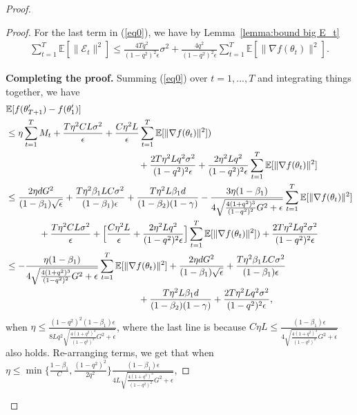 \documentclass[11pt]{article}
\begin{document}
\begin{proof}
\begin{proof}
For the last term in (\ref{eq0}), we have by Lemma~\ref{lemma:bound big E_t}
\begin{align*}
    \sum_{t=1}^T \mathbb E[\|\mathcal E_t\|^2]\leq \frac{4Tq^2}{(1-q^2)^2\epsilon}\sigma^2 + \frac{4q^2}{(1-q^2)^2\epsilon} \sum_{t=1}^T \mathbb E[\|\nabla f(\theta_t)\|^2].
\end{align*}

\textbf{Completing the proof.} Summing (\ref{eq0}) over $t=1,...,T$ and integrating things together, we have
\begin{align*}
    &\mathbb E[f(\theta_{T+1}')-f(\theta_1')]\\
    &\leq \eta \sum_{t=1}^T M_t+\frac{T\eta^2 CL\sigma^2}{\epsilon}+\frac{C\eta^2 L}{\epsilon} \sum_{t=1}^T \mathbb E[\|\nabla f(\theta_t)\|^2])\\
    &\hspace{2in} +\frac{2T\eta^2L q^2\sigma^2}{(1-q^2)^2\epsilon}+ \frac{2\eta^2 L q^2}{(1-q^2)^2\epsilon} \sum_{t=1}^T \mathbb E[\|\nabla f(\theta_t)\|^2]\\
    &\leq \frac{2\eta dG^2}{(1-\beta_1)\sqrt\epsilon}+\frac{T\eta^2 \beta_1 LC\sigma^2}{(1-\beta_1)\epsilon}+\frac{T\eta^2 L\beta_1 d}{(1-\beta_2)(1-\gamma)}- \frac{3\eta(1-\beta_1)}{4\sqrt{\frac{4(1+q^2)^3}{(1-q^2)^2}G^2+\epsilon}}\sum_{t=1}^T \mathbb E[\|\nabla f(\theta_t)\|^2]\\
    &\hspace{0.5in} +\frac{T\eta^2 CL\sigma^2}{\epsilon}+\Big[\frac{C\eta^2 L}{\epsilon}+\frac{2\eta^2 L q^2}{(1-q^2)^2\epsilon} \Big] \sum_{t=1}^T \mathbb E[\|\nabla f(\theta_t)\|^2])+\frac{2T\eta^2L q^2\sigma^2}{(1-q^2)^2\epsilon}\\
    &\leq - \frac{\eta(1-\beta_1)}{4\sqrt{\frac{4(1+q^2)^3}{(1-q^2)^2}G^2+\epsilon}}\sum_{t=1}^T \mathbb E[\|\nabla f(\theta_t)\|^2]+\frac{2\eta dG^2}{(1-\beta_1)\sqrt\epsilon}+\frac{T\eta^2 \beta_1 LC\sigma^2}{(1-\beta_1)\epsilon}\\
    &\hspace{2in} +\frac{T\eta^2 L\beta_1 d}{(1-\beta_2)(1-\gamma)}+\frac{2T\eta^2L q^2\sigma^2}{(1-q^2)^2\epsilon},
\end{align*}
when $\eta\leq \frac{(1-q^2)^2(1-\beta_1)\epsilon}{8Lq^2\sqrt{\frac{4(1+q^2)^3}{(1-q^2)^2}G^2+\epsilon}}$, where the last line is because $C\eta L\leq \frac{(1-\beta_1)\epsilon}{4\sqrt{\frac{4(1+q^2)^3}{(1-q^2)^2}G^2+\epsilon}}$ also holds. Re-arranging terms, we get that when $\eta\leq \min\{\frac{1-\beta_1}{C},\frac{(1-q^2)^2}{2q^2}\}\frac{(1-\beta_1)\epsilon}{4L\sqrt{\frac{4(1+q^2)^3}{(1-q^2)^2}G^2+\epsilon}}$, 

\end{proof}
\end{proof}
\end{document}
